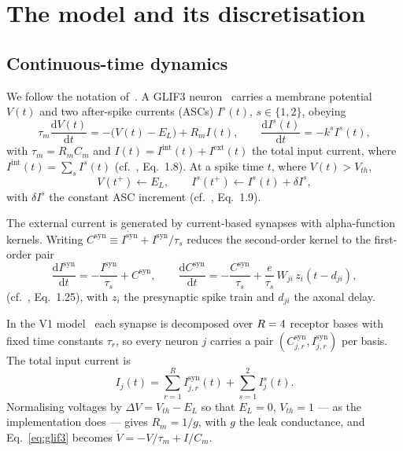 \documentclass[11pt,a4paper,numbers=noenddot]{scrartcl}
\newcommand{\Isyn}{I^{\mathrm{syn}}}
\newcommand{\Csyn}{C^{\mathrm{syn}}}
\newcommand{\Iext}{I^{\mathrm{ext}}}
\newcommand{\Iint}{I^{\mathrm{int}}}
\begin{document}
\section{The model and its discretisation}
\label{sec:model}

\subsection{Continuous-time dynamics}

We follow the notation of~\cite{galvan2025thesis}. A GLIF3
neuron~\cite{mihalas2009generalized,teeter2018generalized} carries a membrane
potential $V(t)$ and two after-spike currents (ASCs) $I^{s}(t)$,
$s\in\{1,2\}$, obeying
%
\begin{equation}
\label{eq:glif3}
\tau_m\frac{\mathrm{d}V(t)}{\mathrm{d}t}
  = -\bigl(V(t)-E_L\bigr) + R_m I(t),
\qquad
\frac{\mathrm{d}I^{s}(t)}{\mathrm{d}t} = -k^{s}I^{s}(t),
\end{equation}
%
with $\tau_m = R_m C_m$ and $I(t) = \Iint(t) + \Iext(t)$ the total input
current, where $\Iint(t)=\sum_s I^{s}(t)$
(cf.~\cite{galvan2025thesis}, Eq.~1.8). At a spike time $t$, where
$V(t) > V_{th}$,
%
\begin{equation}
\label{eq:reset}
V(t^{+}) \leftarrow E_L,
\qquad
I^{s}(t^{+}) \leftarrow I^{s}(t) + \delta I^{s},
\end{equation}
%
with $\delta I^{s}$ the constant ASC increment
(cf.~\cite{galvan2025thesis}, Eq.~1.9).

The external current is generated by current-based synapses with
alpha-function kernels. Writing $\Csyn \equiv \dot{\Isyn} + \Isyn/\tau_s$
reduces the second-order kernel to the first-order
pair~\cite{rotter1999exact,sterratt2023principles}
%
\begin{equation}
\label{eq:alpha}
\frac{\mathrm{d}\Isyn}{\mathrm{d}t} = -\frac{\Isyn}{\tau_s} + \Csyn,
\qquad
\frac{\mathrm{d}\Csyn}{\mathrm{d}t} = -\frac{\Csyn}{\tau_s}
  + \frac{e}{\tau_s}\,W_{ji}\,z_i(t - d_{ji}),
\end{equation}
%
(cf.~\cite{galvan2025thesis}, Eq.~1.25), with $z_i$ the presynaptic spike
train and $d_{ji}$ the axonal delay.

In the V1 model~\cite{billeh2020systematic} each synapse is decomposed over
$R=4$ receptor bases with fixed time constants $\tau_r$, so every
neuron $j$ carries a pair $(\Csyn_{j,r},\Isyn_{j,r})$ per basis. The total
input current is
%
\begin{equation}
\label{eq:total}
I_j(t) = \sum_{r=1}^{R} \Isyn_{j,r}(t) + \sum_{s=1}^{2} I^{s}_j(t).
\end{equation}
%
Normalising voltages by $\Delta V = V_{th}-E_L$ so that $E_L = 0$,
$V_{th} = 1$ --- as the implementation does --- gives
$R_m = 1/g$, with $g$ the leak conductance, and
Eq.~\eqref{eq:glif3} becomes $\dot V = -V/\tau_m + I/C_m$.
\end{document}
